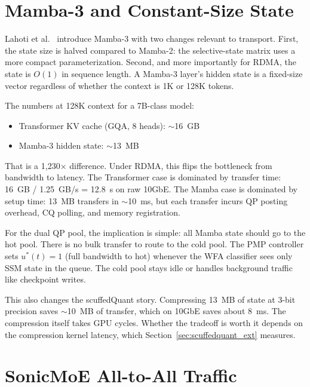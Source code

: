 \documentclass[11pt,letterpaper]{article}
\begin{document}
\section{Mamba-3 and Constant-Size State}
\label{sec:mamba3}

Lahoti et al.~\cite{lahoti2026mamba3} introduce Mamba-3 with two changes relevant to transport. First, the state size is halved compared to Mamba-2: the selective-state matrix uses a more compact parameterization. Second, and more importantly for RDMA, the state is $O(1)$ in sequence length. A Mamba-3 layer's hidden state is a fixed-size vector regardless of whether the context is 1K or 128K tokens.

The numbers at 128K context for a 7B-class model:
\begin{itemize}
\item Transformer KV cache (GQA, 8 heads): $\sim$16~GB
\item Mamba-3 hidden state: $\sim$13~MB
\end{itemize}

That is a 1{,}230$\times$ difference. Under RDMA, this flips the bottleneck from bandwidth to latency. The Transformer case is dominated by transfer time: 16~GB / 1.25~GB/s = 12.8~s on raw 10GbE. The Mamba case is dominated by setup time: 13~MB transfers in $\sim$10~ms, but each transfer incurs QP posting overhead, CQ polling, and memory registration.

For the dual QP pool, the implication is simple: all Mamba state should go to the hot pool. There is no bulk transfer to route to the cold pool. The PMP controller sets $u^*(t) = 1$ (full bandwidth to hot) whenever the WFA classifier sees only SSM state in the queue. The cold pool stays idle or handles background traffic like checkpoint writes.

This also changes the scuffedQuant story. Compressing 13~MB of state at 3-bit precision saves $\sim$10~MB of transfer, which on 10GbE saves about 8~ms. The compression itself takes GPU cycles. Whether the tradeoff is worth it depends on the compression kernel latency, which Section~\ref{sec:scuffedquant_ext} measures.

\section{SonicMoE All-to-All Traffic}
\label{sec:sonicmoe}
\end{document}

